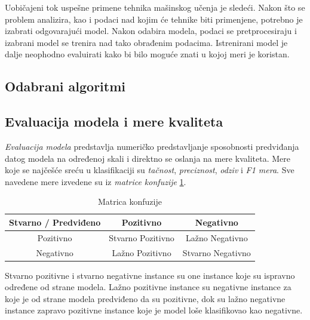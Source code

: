 \documentclass[a4paper]{article}
\theoremstyle{definition}
\begin{document}
{Uobičajeni tok uspešne primene tehnika mašinskog učenja je sledeći. Nakon što se 
problem analizira, kao i podaci nad kojim će tehnike biti primenjene, potrebno je 
izabrati odgovarajući model. Nakon odabira modela, podaci se pretprocesiraju i 
izabrani model se trenira nad tako obrađenim podacima. Istrenirani model je dalje 
neophodno evaluirati kako bi bilo moguće znati u kojoj meri je koristan.

\subsection{Odabrani algoritmi}



\subsection{Evaluacija modela i mere kvaliteta}


\textit{Evaluacija modela} predstavlja numeričko predstavljanje sposobnosti 
predviđanja datog modela na određenoj skali i direktno se oslanja na mere 
kvaliteta. Mere koje se najčešće sreću u klasifikaciji su \textit{tačnost}, 
\textit{preciznost}, \textit{odziv} i \textit{F1 mera}. Sve navedene mere 
izvedene su iz \textit{matrice konfuzije} \ref{table:matrica_konfuzije}.

\begin{table}[h]
	\centering
	\begin{tabular}{ |c|cc| } 
		\hline
		Stvarno / Predviđeno & Pozitivno & Negativno \\ 
		\hline
		Pozitivno & Stvarno Pozitivno & Lažno Negativno \\ 
		Negativno & Lažno Pozitivno & Stvarno Negativno \\ 
		\hline
	\end{tabular}
	\caption{Matrica konfuzije}
	\label{table:matrica_konfuzije}
\end{table}

Stvarno pozitivne i stvarno negativne instance su one instance koje su ispravno 
određene od strane modela. Lažno pozitivne instance su negativne instance za koje 
je od strane modela predviđeno da su pozitivne, dok su lažno negativne instance 
zapravo pozitivne instance koje je model loše klasifikovao kao negativne. 

}
\end{document}
